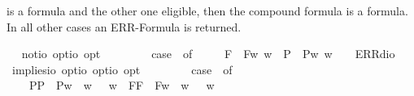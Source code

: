 \begin{isabellebody}
\begin{isamarkuptext}
  is a formula and the other one eligible, then the compound formula is a formula. In all other
  cases an ERR-Formula is returned.%
\end{isamarkuptext}%
\isamarkuptrue%
\ \isamarkupfalse%
\ not{\isacharcolon}{\isacharcolon}{\isachardoublequoteopen}io\ opt{\isasymRightarrow}io\ opt{\isachardoublequoteclose}\ {\isacharparenleft}{\isachardoublequoteopen}\isactrlbold {\isasymnot}\ {\isacharunderscore}{\isachardoublequoteclose}\ {\isacharbrackleft}{}{}{\isacharbrackright}\ {}{}{\isacharparenright}\ \ {\isachardoublequoteopen}\isactrlbold {\isasymnot}\ {\isasymphi}\ {\isasymequiv}\ case\ {\isasymphi}\ of\ \isanewline
\ \ \ \ F{\isacharparenleft}{\isasympsi}{\isacharparenright}\ {\isasymRightarrow}\ F{\isacharparenleft}{\isasymlambda}w{\isachardot}{\isasymnot}{\isacharparenleft}{\isasympsi}\ w{\isacharparenright}{\isacharparenright}\ {\isacharbar}\ P{\isacharparenleft}{\isasympsi}{\isacharparenright}\ {\isasymRightarrow}\ P{\isacharparenleft}{\isasymlambda}w{\isachardot}{\isasymnot}{\isacharparenleft}{\isasympsi}\ w{\isacharparenright}{\isacharparenright}\ {\isacharbar}\ {\isacharunderscore}\ {\isasymRightarrow}\ ERR{\isacharparenleft}dio{\isacharparenright}{\isachardoublequoteclose}\ \ \isanewline
\ \isamarkupfalse%
\ implies{\isacharcolon}{\isacharcolon}{\isachardoublequoteopen}io\ opt{\isasymRightarrow}io\ opt{\isasymRightarrow}io\ opt{\isachardoublequoteclose}\ {\isacharparenleft}\ {\isachardoublequoteopen}\isactrlbold {\isasymrightarrow}{\isachardoublequoteclose}\ {}{}{\isacharparenright}\ \ {\isachardoublequoteopen}{\isasymphi}\ \isactrlbold {\isasymrightarrow}\ {\isasympsi}\ {\isasymequiv}\ case\ {\isacharparenleft}{\isasymphi}{\isacharcomma}{\isasympsi}{\isacharparenright}\ of\ \isanewline
\ \ \ \ {\isacharparenleft}P{\isacharparenleft}{\isasymalpha}{\isacharparenright}{\isacharcomma}P{\isacharparenleft}{\isasymbeta}{\isacharparenright}{\isacharparenright}\ {\isasymRightarrow}\ P{\isacharparenleft}{\isasymlambda}w{\isachardot}\ {\isasymalpha}\ w\ {\isasymlongrightarrow}\ {\isasymbeta}\ w{\isacharparenright}\ {\isacharbar}\ {\isacharparenleft}F{\isacharparenleft}{\isasymalpha}{\isacharparenright}{\isacharcomma}F{\isacharparenleft}{\isasymbeta}{\isacharparenright}{\isacharparenright}\ {\isasymRightarrow}\ F{\isacharparenleft}{\isasymlambda}w{\isachardot}\ {\isasymalpha}\ w\ {\isasymlongrightarrow}\ {\isasymbeta}\ w{\isacharparenright}\ {\isacharbar}\ \isanewline

\end{isabellebody}
